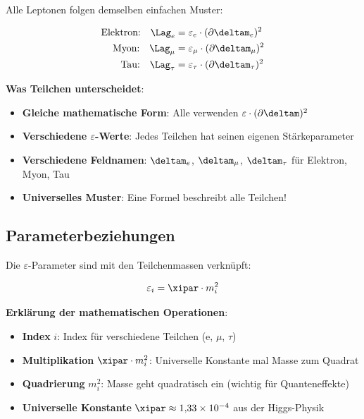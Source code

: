 	Alle Leptonen folgen demselben einfachen Muster:
	
	\begin{align}
		\text{Elektron:} \quad \Lag_e &= \varepsilon_e \cdot (\partial \deltam_e)^2 \\
		\text{Myon:} \quad \Lag_{\mu} &= \varepsilon_{\mu} \cdot (\partial \deltam_{\mu})^2 \\
		\text{Tau:} \quad \Lag_{\tau} &= \varepsilon_{\tau} \cdot (\partial \deltam_{\tau})^2
	\end{align}
	
	\textbf{Was Teilchen unterscheidet}:
	\begin{itemize}
		\item \textbf{Gleiche mathematische Form}: Alle verwenden $\varepsilon \cdot (\partial \deltam)^2$
		\item \textbf{Verschiedene $\varepsilon$-Werte}: Jedes Teilchen hat seinen eigenen Stärkeparameter
		\item \textbf{Verschiedene Feldnamen}: $\deltam_e$, $\deltam_{\mu}$, $\deltam_{\tau}$ für Elektron, Myon, Tau
		\item \textbf{Universelles Muster}: Eine Formel beschreibt alle Teilchen!
	\end{itemize}
	
	\subsection{Parameterbeziehungen}
	
	Die $\varepsilon$-Parameter sind mit den Teilchenmassen verknüpft:
	
	\begin{equation}
		\varepsilon_i = \xipar \cdot m_i^2
		\label{eq:epsilon_mass_relation}
	\end{equation}
	
	\textbf{Erklärung der mathematischen Operationen}:
	\begin{itemize}
		\item \textbf{Index} $i$: Index für verschiedene Teilchen (e, $\mu$, $\tau$)
		\item \textbf{Multiplikation} $\xipar \cdot m_i^2$: Universelle Konstante mal Masse zum Quadrat
		\item \textbf{Quadrierung} $m_i^2$: Masse geht quadratisch ein (wichtig für Quanteneffekte)
		\item \textbf{Universelle Konstante} $\xipar \approx 1{,}33 \times 10^{-4}$ aus der Higgs-Physik
	\end{itemize}
	
